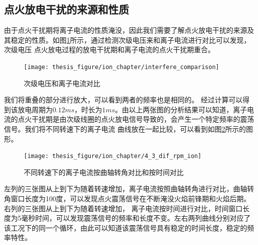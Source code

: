 \subsection{点火放电干扰的来源和性质}
由于点火干扰期将离子电流的性质淹没，因此我们需要了解点火放电干扰的来源及其稳定的性质。如图\ref{fig:itf_rs}所示，通过检测次级电压来和离子电流进行对比可以发现，次级电压
点火放电过程的放电干扰期和离子电流的点火干扰期重合。\par
\begin{figure}[H]
	\centering
	\texttt{[image: thesis\_figure/ion\_chapter/interfere\_comparison]}
	\caption{\label{fig:itf_rs}次级电压和离子电流对比}
\end{figure}
我们将重叠的部分进行放大，可以看到两者的频率也是相同的。
经过计算可以得到该放电周期为$0.12ms$，时长为$1ms$。由以上两张图的分析结果可以知道，离子电流的点火干扰期是由次级线圈的点火放电信号导致的，会产生一个特定频率的震荡信号。我们将不同转速下的离子电流
曲线放在一起比较，可以看到如图\ref{fig:4_3_dif_rpm_ion}所示的图形。\par
\begin{figure}[!ht]
	\centering
	\texttt{[image: thesis\_figure/ion\_chapter/4\_3\_dif\_rpm\_ion]}
	\caption{不同转速下的离子电流按曲轴转角对比和按时间对比}
	\label{fig:4_3_dif_rpm_ion}
\end{figure}
左列的三张图从上到下为随着转速增加，离子电流按照曲轴转角进行对比，曲轴转角窗口长度为100度，可以发现点火震荡信号在不断淹没火焰前锋期和火焰后期。右列的三张图从上到下为随着转速增加，
离子电流按时间进行对比，时间窗口长度为5毫秒时间，可以发现震荡信号的频率和长度不变。左右两列曲线分别对应了该工况下的同一个循环，由此可以知道该震荡信号具有稳定的时间长度，稳定的频率特性。
